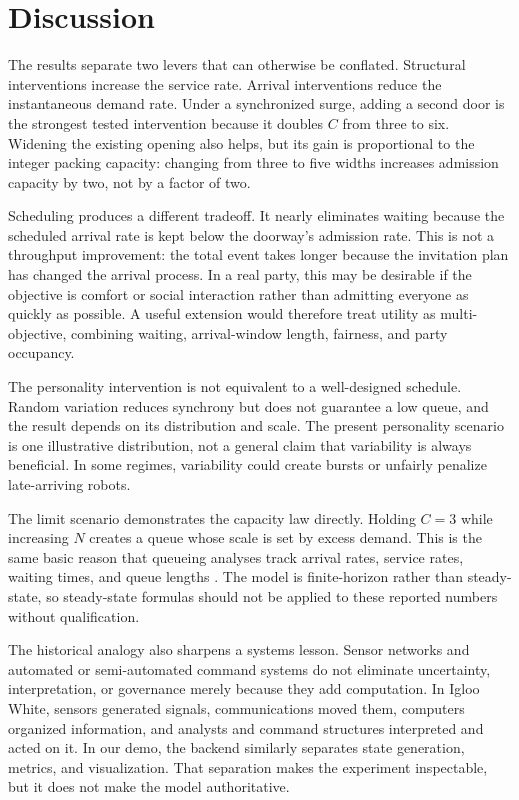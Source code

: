 \documentclass[11pt]{article}
\begin{document}
\section{Discussion}
The results separate two levers that can otherwise be conflated. Structural interventions increase the service rate. Arrival interventions reduce the instantaneous demand rate. Under a synchronized surge, adding a second door is the strongest tested intervention because it doubles $C$ from three to six. Widening the existing opening also helps, but its gain is proportional to the integer packing capacity: changing from three to five widths increases admission capacity by two, not by a factor of two.

Scheduling produces a different tradeoff. It nearly eliminates waiting because the scheduled arrival rate is kept below the doorway's admission rate. This is not a throughput improvement: the total event takes longer because the invitation plan has changed the arrival process. In a real party, this may be desirable if the objective is comfort or social interaction rather than admitting everyone as quickly as possible. A useful extension would therefore treat utility as multi-objective, combining waiting, arrival-window length, fairness, and party occupancy.

The personality intervention is not equivalent to a well-designed schedule. Random variation reduces synchrony but does not guarantee a low queue, and the result depends on its distribution and scale. The present personality scenario is one illustrative distribution, not a general claim that variability is always beneficial. In some regimes, variability could create bursts or unfairly penalize late-arriving robots.

The limit scenario demonstrates the capacity law directly. Holding $C=3$ while increasing $N$ creates a queue whose scale is set by excess demand. This is the same basic reason that queueing analyses track arrival rates, service rates, waiting times, and queue lengths \cite{gross1998,kingman1961}. The model is finite-horizon rather than steady-state, so steady-state formulas should not be applied to these reported numbers without qualification.

The historical analogy also sharpens a systems lesson. Sensor networks and automated or semi-automated command systems do not eliminate uncertainty, interpretation, or governance merely because they add computation. In Igloo White, sensors generated signals, communications moved them, computers organized information, and analysts and command structures interpreted and acted on it. In our demo, the backend similarly separates state generation, metrics, and visualization. That separation makes the experiment inspectable, but it does not make the model authoritative.
\end{document}
